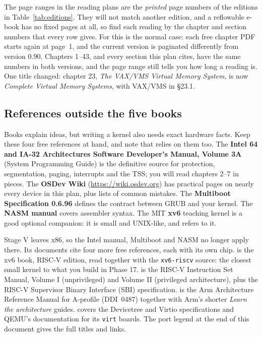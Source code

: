 \documentclass[11pt,a4paper]{article}
\begin{document}
\begin{warnbox}
The page ranges in the reading plans are the \emph{printed} page numbers of the editions in Table~\ref{tab:editions}.
They will not match another edition, and a reflowable e-book has no fixed pages at all, so find each reading by the
chapter and section numbers that every row gives. For \OSTEP this is the normal case: each free chapter PDF starts again at page~1, and the
current version is paginated differently from version 0.90. Chapters 1--43, and every section this plan cites, have
the same numbers in both versions, and the page range still tells you how long a reading is. One title changed:
chapter 23, \emph{The VAX/VMS Virtual Memory System}, is now \emph{Complete Virtual Memory Systems}, with VAX/VMS in \S23.1.
\end{warnbox}

\subsection{References outside the five books}

Books explain ideas, but writing a kernel also needs exact hardware facts. Keep these four free references at hand,
and note that \LOB relies on them too. The \textbf{Intel 64 and IA-32 Architectures Software Developer's Manual,
Volume 3A} (System Programming Guide) is the definitive source for protection, segmentation, paging, interrupts and
the TSS; you will read chapters 2--7 in pieces. The \textbf{OSDev Wiki} (\url{https://wiki.osdev.org}) has
practical pages on nearly every device in this plan, plus lists of common mistakes. The \textbf{Multiboot
Specification 0.6.96} defines the contract between GRUB and your kernel. The \textbf{NASM manual} covers assembler
syntax. The MIT \textbf{xv6} teaching kernel is a good optional companion: it is small and UNIX-like, and \OSTEP
refers to it.

Stage V leaves x86, so the Intel manual, Multiboot and NASM no longer apply there. Its documents cite four more
free references, each with its own chip. \XVSIX is the xv6 book, RISC-V edition, read together with the
\texttt{xv6-riscv} source: the closest small kernel to what you build in Phase 17. \RVSPEC is the RISC-V
Instruction Set Manual, Volume I (unprivileged) and Volume II (privileged architecture), plus the RISC-V
Supervisor Binary Interface (SBI) specification. \ARMDOC is the Arm Architecture Reference Manual for A-profile
(DDI~0487) together with Arm's shorter \emph{Learn the architecture} guides. \SPEC covers the Devicetree and Virtio
specifications and QEMU's documentation for its \texttt{virt} boards. The port legend at the end of this document
gives the full titles and links.
\end{document}
